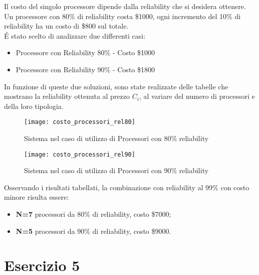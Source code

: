 Il costo del singolo processore dipende dalla reliability che si desidera ottenere.\\
Un processore con 80\% di reliability costa \$1000, ogni incremento del 10\% di
reliability ha un costo di \$800 sul totale.\\
\'E stato scelto di analizzare due differenti casi:
\begin{itemize}
  \item Processore con Reliability 80\% - Costo \$1000
  \item Processore con Reliability 90\% - Costo \$1800
\end{itemize}

\clearpage

In funzione di queste due soluzioni, sono state realizzate delle tabelle che
mostrano la reliability ottenuta al prezzo $C_i$, al variare del numero di processori
e della loro tipologia.\\

\begin{figure}[!htbp]
  \centering
  \texttt{[image: costo\_processori\_rel80]}
  \caption{Sistema nel caso di utilizzo di Processori con 80\% reliability}
  \label{costo_processori_rel80}
\end{figure}

\begin{figure}[!htbp]
  \centering
  \texttt{[image: costo\_processori\_rel90]}
  \caption{Sistema nel caso di utilizzo di Processori con 90\% reliability}
  \label{costo_processori_rel90}
\end{figure}

Osservando i risultati tabellati, la combinazione con reliability al 99\% con
costo minore risulta essere:
\begin{itemize}
  \item \textbf{N=7} processori da 80\% di reliability, costo \$7000;
  \item \textbf{N=5} processori da 90\% di reliability, costo \$9000.
\end{itemize}

\clearpage

\section{Esercizio 5}
